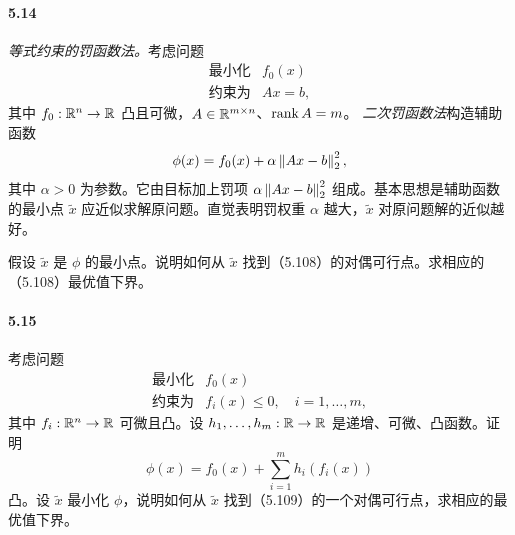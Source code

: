 \paragraph{5.14} \emph{等式约束的罚函数法。}考虑问题
\begin{equation}
\begin{array}{ll}\text{最小化}&f_0(x)\\\text{约束为}&Ax=b,\end{array}\tag{5.108}
\end{equation}
其中 $f_0:\mathbb R^n\to\mathbb R$ 凸且可微，$A\in\mathbb R^{m\times n}$、$\operatorname{rank} A=m$。
\emph{二次罚函数法}构造辅助函数
\[
\phi(x)=f_0(x)+\alpha\left\lVert Ax-b\right\rVert_2^2,
\]
其中 $\alpha>0$ 为参数。它由目标加上罚项 $\alpha\left\lVert Ax-b\right\rVert_2^2$ 组成。基本思想是辅助函数的最小点 $\widetilde x$ 应近似求解原问题。直觉表明罚权重 $\alpha$ 越大，$\widetilde x$ 对原问题解的近似越好。

假设 $\widetilde x$ 是 $\phi$ 的最小点。说明如何从 $\widetilde x$ 找到（5.108）的对偶可行点。求相应的（5.108）最优值下界。

\paragraph{5.15} 考虑问题
\begin{equation}
\begin{array}{ll}\text{最小化}&f_0(x)\\
\text{约束为}&f_i(x)\le0,\quad i=1,\ldots,m,\end{array}\tag{5.109}
\end{equation}
其中 $f_i:\mathbb R^n\to\mathbb R$ 可微且凸。设 $h_1,\ldots,h_m:\mathbb R\to\mathbb R$ 是递增、可微、凸函数。证明
\[
\phi(x)=f_0(x)+\sum_{i=1}^m h_i(f_i(x))
\]
凸。设 $\widetilde x$ 最小化 $\phi$，说明如何从 $\widetilde x$ 找到（5.109）的一个对偶可行点，求相应的最优值下界。

